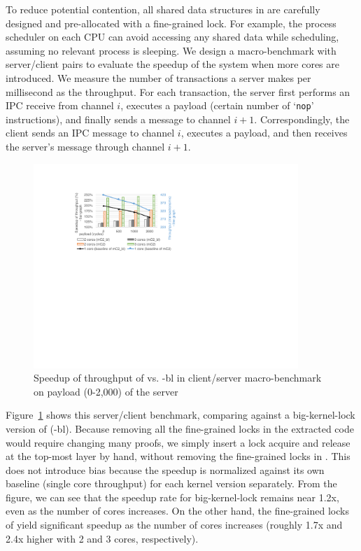 To reduce potential contention, all shared data
structures in {\cCTOS} are carefully designed and pre-allocated with a
fine-grained lock. For example, the process scheduler on each CPU can
avoid accessing any shared data while scheduling, assuming no relevant process is sleeping.
We design a macro-benchmark with server/client pairs to
evaluate the speedup of the system when more cores are introduced. We measure the
number of transactions a server makes per millisecond as the throughput. For each
transaction, the server first performs an IPC receive from channel $i$, 
executes a payload (certain number of `\texttt{nop}' instructions), and finally
sends a message to channel $i + 1$. Correspondingly, the client sends an
IPC message to channel $i$, executes a payload, and then receives the
server's message through channel $i + 1$.

\begin{figure}\centering
	\hspace{-.2cm}
	\includegraphics[width=10cm]{figs/speedup_big_lock.pdf}
	\hspace{-.2cm}
	\caption{Speedup of throughput of \cCTOS{} vs. {\cCTOS-bl} in client/server macro-benchmark on payload (0-2,000) of the server}
	\label{fig:speedup_big_lock}
	\hrulefill
\end{figure}


Figure~\ref{fig:speedup_big_lock} shows this server/client benchmark, comparing {\cCTOS} against a
big-kernel-lock version of {\cCTOS} ({\cCTOS-bl}). Because removing all the
fine-grained locks in the extracted code would require changing many proofs, we simply
insert a lock acquire and release at the top-most layer by hand, without
removing the fine-grained locks in {\cCTOS}. This does not introduce bias
because the speedup is normalized against its own baseline (single core throughput)
for each kernel version separately.
From the figure, we can see that
the speedup rate for big-kernel-lock remains near 1.2x, even as the
number of cores increases. On the other hand, the fine-grained locks of {\cCTOS}
yield significant speedup as the number of cores increases (roughly
1.7x and 2.4x higher with 2 and 3 cores, respectively).

